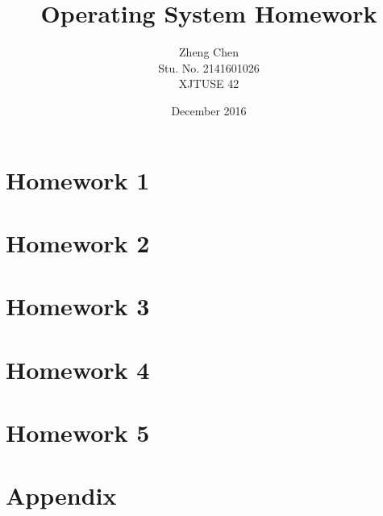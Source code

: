 \documentclass{report}
\title{Operating System Homework}
\author{Zheng Chen \\ Stu. No. 2141601026 \\ XJTUSE 42}
\date{December 2016}
\newcommand \blankpage{
    \null
    \thispagestyle{empty}
    \addtocounter{page}{-1}
    \newpage
}
\begin{document}
\maketitle

\afterpage{\blankpage}

\tableofcontents

\afterpage{\blankpage}

\part{Homework 1}


\part{Homework 2}


\part{Homework 3}


\part{Homework 4}


\part{Homework 5}


\part{Appendix}
\listoflistings
\end{document}
